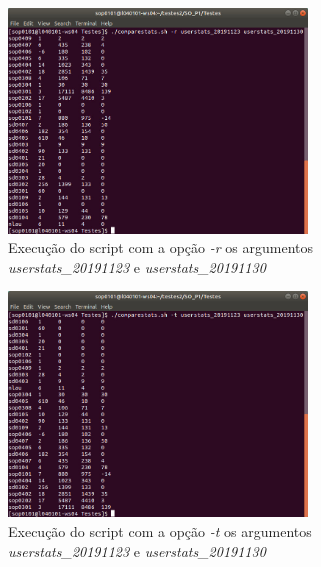 \documentclass[10pt,portuguese]{article}
\begin{document}
\begin{figure}[!h]
    \centering
    \includegraphics[width=300]{Resultados/compare_r.jpeg}
    \caption{Execução do script com a opção \textit{-r} os argumentos \textit{userstats\_20191123} e \textit{userstats\_20191130}}
\end{figure}
\begin{figure}[!h]
    \centering
    \includegraphics[width=300]{Resultados/compare_t.jpeg}
    \caption{Execução do script com a opção \textit{-t} os argumentos \textit{userstats\_20191123} e \textit{userstats\_20191130}}
\end{figure}

\clearpage
\end{document}
